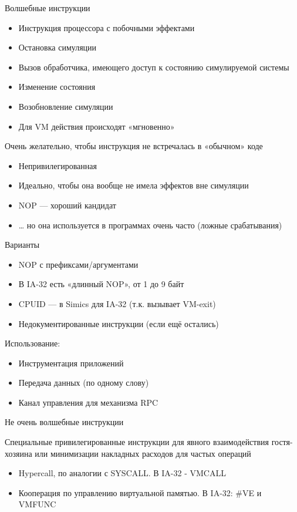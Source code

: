 \begin{frame}[allowframebreaks]{Волшебные инструкции}

\begin{itemize}
\item Инструкция процессора с побочными эффектами
\item Остановка симуляции
\item Вызов обработчика, имеющего доступ к состоянию симулируемой системы
\item Изменение состояния
\item Возобновление симуляции
\item Для VM действия происходят «мгновенно»
\end{itemize}

Очень желательно, чтобы инструкция не встречалась в «обычном» коде

\begin{itemize}
\item Непривилегированная
\item Идеально, чтобы она вообще не имела эффектов вне симуляции
\item NOP — хороший кандидат
\item … но она используется в программах очень часто (ложные срабатывания)
\end{itemize}

Варианты
\begin{itemize}
\item NOP с префиксами/аргументами
\item В IA-32 есть «длинный NOP», от 1 до 9 байт
\item CPUID — в Simics для IA-32 (т.к. вызывает VM-exit)
\item Недокументированные инструкции (если ещё остались)
\end{itemize}

Использование:
\begin{itemize}
\item Инструментация приложений
\item Передача данных (по одному слову)
\item Канал управления для механизма RPC
\end{itemize}

\end{frame}

\begin{frame}{Не очень волшебные инструкции}

Специальные привилегированные инструкции для явного взаимодействия гостя-хозяина 
или минимизации накладных расходов для частых операций

\begin{itemize}
\item Hypercall, по аналогии с SYSCALL. В IA-32 - VMCALL
\item Кооперация по управлению виртуальной памятью. В IA-32: \#VE и VMFUNC
\end{itemize}

\end{frame}

